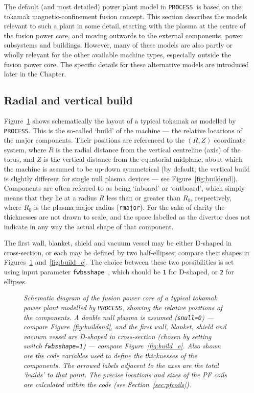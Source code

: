 \documentclass[11pt,a4paper]{report}
\newcommand{\process}{\mbox{\texttt{PROCESS}}}
\begin{document}
The default (and most detailed) power plant model in \process\ is based on the
tokamak magnetic-confinement fusion concept. This section describes the models
relevant to such a plant in some detail, starting with the plasma at the
centre of the fusion power core, and moving outwards to the external
components, power subsystems and buildings. However, many of these models are
also partly or wholly relevant for the other available machine types,
especially outside the fusion power core. The specific details for these
alternative models are introduced later in the Chapter.

\subsection{Radial and vertical build}

Figure~\ref{fig:build_d} shows schematically the layout of a typical tokamak
as modelled by \process. This is the so-called `build' of the machine --- the
relative locations of the major components. Their positions are referenced to
the $(R,Z)$ coordinate system, where $R$ is the radial distance from the
vertical centreline (axis) of the torus, and $Z$ is the vertical distance from
the equatorial midplane, about which the machine is assumed to be up-down
symmetrical (by default; the vertical build is slightly different for single
null plasma devices --- see Figure~\ref{fig:buildsnd}). Components are often
referred to as being `inboard' or `outboard', which simply means that they lie
at a radius $R$ less than or greater than $R_0$, respectively, where $R_0$ is
the plasma major radius (\texttt{rmajor}). For the sake of clarity the
thicknesses are not drawn to scale, and the space labelled as the divertor
does not indicate in any way the actual shape of that component.

The first wall, blanket, shield and vacuum vessel may be either D-shaped in
cross-section, or each may be defined by two half-ellipses; compare their
shapes in Figures~\ref{fig:build_d} and~\ref{fig:build_e}. The choice between
these two possibilities is set using input parameter
\texttt{fwbsshape}~\cite{fwbsshape}, which should be \texttt{1} for D-shaped,
or \texttt{2} for ellipses.

\begin{figure}[tbph]
\caption[Machine build for D-shaped major components]
{\label{fig:build_d} \textit{Schematic diagram of the fusion
    power core of a typical tokamak power plant modelled by \process, showing
    the relative positions of the components. A double null plasma is assumed
    (\texttt{snull=0}) --- compare Figure~\ref{fig:buildsnd}, and the first
    wall, blanket, shield and vacuum vessel are D-shaped in cross-section
    (chosen by setting switch \texttt{fwbsshape=1}) --- compare
    Figure~\ref{fig:build_e}. Also shown are the code variables used to define
    the thicknesses of the components. The arrowed labels adjacent to the axes
    are the total `builds' to that point. The precise locations and sizes of
    the PF coils are calculated within the code (see
    Section~\ref{sec:pfcoils}).}  }
\end{figure}
\end{document}

